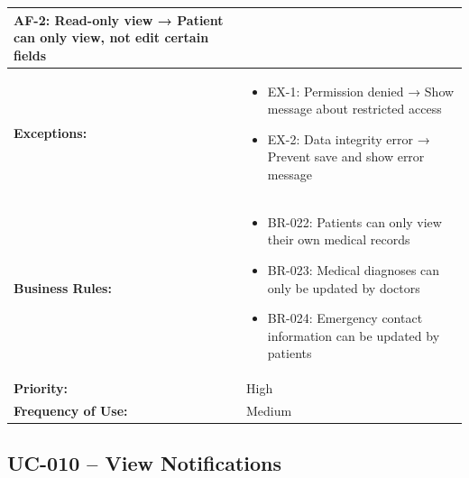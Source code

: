 \documentclass[12pt,a4paper]{article}
\begin{document}
\begin{longtable}{|p{4.5cm}|p{10.5cm}|}
\textbf{AF-2:} Read-only view → Patient can only view, not edit certain fields \\
\hline
\textbf{Exceptions:} &
\begin{itemize}
  \item EX-1: Permission denied → Show message about restricted access
  \item EX-2: Data integrity error → Prevent save and show error message
\end{itemize} \\
\hline
\textbf{Business Rules:} &
\begin{itemize}
  \item BR-022: Patients can only view their own medical records
  \item BR-023: Medical diagnoses can only be updated by doctors
  \item BR-024: Emergency contact information can be updated by patients
\end{itemize} \\
\hline
\textbf{Priority:} & High \\
\hline
\textbf{Frequency of Use:} & Medium \\
\hline
\end{longtable}

\subsection{UC-010 – View Notifications}
\end{document}

